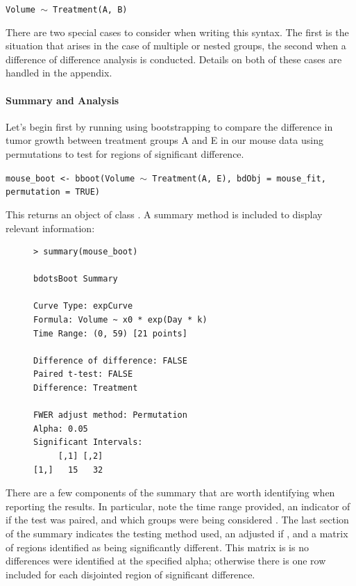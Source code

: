 \begin{center}
\tt Volume $\sim$ Treatment(A, B)
\end{center}

There are two special cases to consider when writing this syntax. The first is the situation that arises in the case of multiple or nested groups, the second when a difference of difference analysis is conducted. Details on both of these cases are handled in the appendix. 



\paragraph{Summary and Analysis}

Let's begin first by running  using bootstrapping to compare the difference in tumor growth between treatment groups A and E in our mouse data using permutations to test for regions of significant difference. 


\begin{center}
\tt mouse\_boot <- bboot(Volume $\sim$ Treatment(A, E), bdObj = mouse\_fit, permutation = TRUE)
\end{center}


This returns an object of class . A summary method is included to display relevant information:

\begin{singlespace}
\begin{figure}[H]
\centering
\begin{BVerbatim}
> summary(mouse_boot)

bdotsBoot Summary

Curve Type: expCurve 
Formula: Volume ~ x0 * exp(Day * k) 
Time Range: (0, 59) [21 points]

Difference of difference: FALSE 
Paired t-test: FALSE 
Difference: Treatment 

FWER adjust method: Permutation 
Alpha: 0.05 
Significant Intervals:
     [,1] [,2]
[1,]   15   32
\end{BVerbatim}
\end{figure}
\end{singlespace}

There are a few components of the summary that are worth identifying when reporting the results. In particular, note the time range provided, an indicator of if the test was paired, and which groups were being considered . The last section of the summary indicates the testing method used, an adjusted  if , and a matrix of regions identified as being significantly different. This matrix is  is no differences were identified at the specified alpha; otherwise there is one row included for each disjointed region of significant difference.

